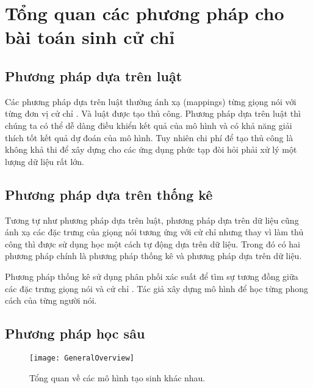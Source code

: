 \section{Tổng quan các phương pháp cho bài toán sinh cử chỉ}
\label{sec:relatedwork}



\subsection{Phương pháp dựa trên luật}

Các phương pháp dựa trên luật thường ánh xạ (mappings) từng giọng nói với từng đơn vị cử chỉ \cite{huang2012robot}. Và luật được tạo thủ công. Phương pháp dựa trên luật thì chúng ta có thể dễ dàng điều khiển kết quả của mô hình và có khả năng giải thích tốt kết quả dự đoán của mô hình.
Tuy nhiên chi phí để tạo thủ công là không khả thi để xây dựng cho các ứng dụng phức tạp đòi hỏi phải xử lý một lượng dữ liệu rất lớn.

\subsection{Phương pháp dựa trên thống kê}

Tương tự như phương pháp dựa trên luật, phương pháp dựa trên dữ liệu cũng ánh xạ các đặc trưng của giọng nói tương ứng với cử chỉ nhưng thay vì làm thủ công thì được sử dụng học một cách tự động dựa trên dữ liệu.
Trong đó có hai phương pháp chính là phương pháp thống kê và phương pháp dựa trên dữ liệu.


Phương pháp thống kê sử dụng phân phối xác suất để tìm sự tương đồng giữa các đặc trưng giọng nói và cử chỉ \cite{levine2010gesture}. Tác giả \cite{neff2008gesture} xây dựng mô hình để học từng phong cách của từng người nói.

\subsection{Phương pháp học sâu}

\setcounter{figure}{3}
\begin{figure}[H]
	\centering
	\texttt{[image: GeneralOverview]}
	\caption{Tổng quan về các mô hình tạo sinh khác nhau.}
	\label{fig:GeneralOverview}
\end{figure}

